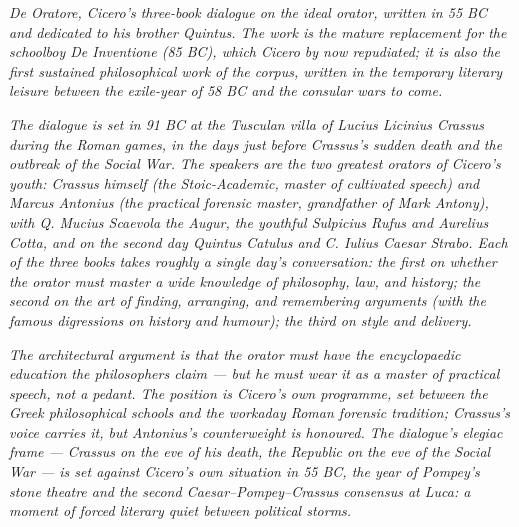 
\textit{De Oratore, Cicero's three-book dialogue on the ideal
orator, written in 55 BC and dedicated to his brother Quintus.
The work is the mature replacement for the schoolboy
\textit{De Inventione} (85 BC), which Cicero by now repudiated;
it is also the first sustained philosophical work of the
corpus, written in the temporary literary leisure between the
exile-year of 58 BC and the consular wars to come.}

\textit{The dialogue is set in 91 BC at the Tusculan villa of
Lucius Licinius Crassus during the Roman games, in the days
just before Crassus's sudden death and the outbreak of the
Social War. The speakers are the two greatest orators of
Cicero's youth: Crassus himself (the Stoic-Academic, master
of cultivated speech) and Marcus Antonius (the practical
forensic master, grandfather of Mark Antony), with Q. Mucius
Scaevola the Augur, the youthful Sulpicius Rufus and Aurelius
Cotta, and on the second day Quintus Catulus and C. Iulius
Caesar Strabo. Each of the three books takes roughly a single
day's conversation: the first on whether the orator must
master a wide knowledge of philosophy, law, and history;
the second on the art of finding, arranging, and remembering
arguments (with the famous digressions on history and humour);
the third on style and delivery.}

\textit{The architectural argument is that the orator
\textit{must} have the encyclopaedic education the philosophers
claim — but he must wear it as a master of practical speech,
not a pedant. The position is Cicero's own programme, set
between the Greek philosophical schools and the workaday Roman
forensic tradition; Crassus's voice carries it, but Antonius's
counterweight is honoured. The dialogue's elegiac frame —
Crassus on the eve of his death, the Republic on the eve of
the Social War — is set against Cicero's own situation in 55
BC, the year of Pompey's stone theatre and the second
Caesar–Pompey–Crassus consensus at Luca: a moment of forced
literary quiet between political storms.}
